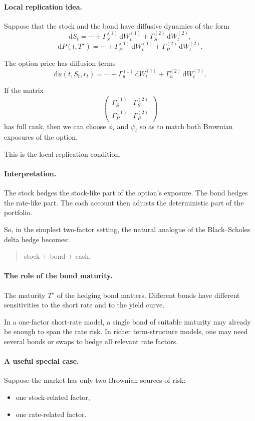 \documentclass[11pt]{article}
\theoremstyle{plain}
\theoremstyle{definition}
\theoremstyle{remark}
\begin{document}
\paragraph{Local replication idea.}
Suppose that the stock and the bond have diffusive dynamics of the form
\[
\mathrm{d}S_t=\cdots+\Gamma_S^{(1)}\,\mathrm{d}W_t^{(1)}+\Gamma_S^{(2)}\,\mathrm{d}W_t^{(2)},
\]
\[
\mathrm{d}P(t,T^\star)=\cdots+\Gamma_P^{(1)}\,\mathrm{d}W_t^{(1)}+\Gamma_P^{(2)}\,\mathrm{d}W_t^{(2)}.
\]

The option price has diffusion terms
\[
\mathrm{d}u(t,S_t,r_t)
=
\cdots+\Gamma_u^{(1)}\,\mathrm{d}W_t^{(1)}+\Gamma_u^{(2)}\,\mathrm{d}W_t^{(2)}.
\]

If the matrix
\[
\begin{pmatrix}
\Gamma_S^{(1)} & \Gamma_S^{(2)}\\
\Gamma_P^{(1)} & \Gamma_P^{(2)}
\end{pmatrix}
\]
has full rank, then we can choose \(\phi_t\) and \(\psi_t\) so as to
match both Brownian exposures of the option.

This is the local replication condition.

\paragraph{Interpretation.}
The stock hedges the stock-like part of the option's exposure.
The bond hedges the rate-like part.
The cash account then adjusts the deterministic part of the portfolio.

So, in the simplest two-factor setting, the natural analogue of the
Black--Scholes delta hedge becomes:
\begin{quote}
stock \(+\) bond \(+\) cash.
\end{quote}

\paragraph{The role of the bond maturity.}
The maturity \(T^\star\) of the hedging bond matters.
Different bonds have different sensitivities to the short rate and to the
yield curve.

In a one-factor short-rate model, a single bond of suitable maturity may
already be enough to span the rate risk.
In richer term-structure models, one may need several bonds or swaps to
hedge all relevant rate factors.

\paragraph{A useful special case.}
Suppose the market has only two Brownian sources of risk:
\begin{itemize}[leftmargin=1.4em]
    \item one stock-related factor,
    \item one rate-related factor.
\end{itemize}
\end{document}
